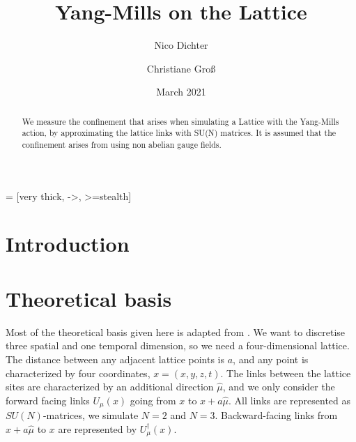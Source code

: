 \documentclass[%
 reprint,
 amsmath,amssymb,
 aps,
]{revtex4-1}
\begin{document}
	 = [very thick, ->, >=stealth]

\title{Yang-Mills on the Lattice}%

\author{Nico Dichter}
\author{Christiane Gro\ss{}}


\date{March 2021}%

\begin{abstract}
	We measure the confinement that arises when simulating a Lattice with the Yang-Mills action, by approximating the lattice links with SU(N) matrices. It is assumed that the confinement arises from using non abelian gauge fields.
\end{abstract}
\maketitle


\section{Introduction}


\section{Theoretical basis}

Most of the theoretical basis given here is adapted from \citet{lepagelqcd}. We want to discretise three spatial and one temporal dimension, so we need a four-dimensional lattice. The distance between any adjacent lattice points is $a$, and any point is characterized by four coordinates, $x=(x,y,z,t)$. The links between the lattice sites are characterized by an additional direction $\hat{\mu}$, and we only consider the forward facing links $U_\mu(x)$ going from $x$ to $x+a\hat{\mu}$. All links are represented as $SU(N)$-matrices, we simulate $N=2$ and $N=3$. Backward-facing links from $x+a\hat{\mu}$ to $x$ are represented by $U_\mu^\dagger(x)$.
\end{document}
